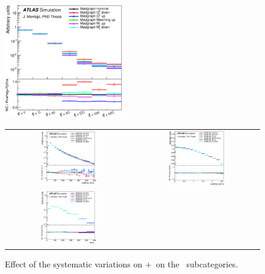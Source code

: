 \begin{figure}[p]
\begin{center}
\includegraphics[width=0.46\textwidth]{Modeling/Figures/mgcc_realHFcc_extHFtype_ttcc_norm.eps}
\caption{Effect of the systematic variations on \madgraph+\pythia\ on the \ttcc\ subcategories.}
\label{fig:mgcc_extHFtype_app}
\end{center}
\vspace{-20pt}
\begin{center}
\begin{tabular}{cc}
\includegraphics[width=0.46\textwidth]{Modeling/Figures/mgcc_tt1cq_q1_pt_norm.eps} &
\includegraphics[width=0.46\textwidth]{Modeling/Figures/mgcc_tt1cq_q1_eta_norm.eps} \\
\includegraphics[width=0.46\textwidth]{Modeling/Figures/mgcc_tt1cq_top_pt_norm.eps} &

\end{tabular}
\end{center}
\end{figure}

